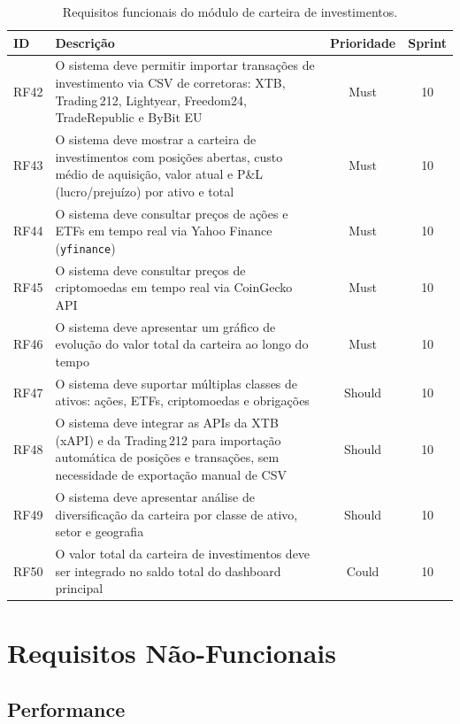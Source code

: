\begin{table}[H]
\centering
\caption{Requisitos funcionais do módulo de carteira de investimentos.}
\label{tab:rf-investimentos}
\small
\begin{tabularx}{\textwidth}{l X c c}
\toprule
\textbf{ID} & \textbf{Descrição} & \textbf{Prioridade} & \textbf{Sprint} \\
\midrule
RF42 & O sistema deve permitir importar transações de investimento via CSV de corretoras: XTB, Trading\,212, Lightyear, Freedom24, TradeRepublic e ByBit EU & Must & 10 \\
RF43 & O sistema deve mostrar a carteira de investimentos com posições abertas, custo médio de aquisição, valor atual e P\&L (lucro/prejuízo) por ativo e total & Must & 10 \\
RF44 & O sistema deve consultar preços de ações e ETFs em tempo real via Yahoo Finance (\texttt{yfinance}) & Must & 10 \\
RF45 & O sistema deve consultar preços de criptomoedas em tempo real via CoinGecko \ac{API} & Must & 10 \\
RF46 & O sistema deve apresentar um gráfico de evolução do valor total da carteira ao longo do tempo & Must & 10 \\
RF47 & O sistema deve suportar múltiplas classes de ativos: ações, ETFs, criptomoedas e obrigações & Should & 10 \\
RF48 & O sistema deve integrar as APIs da XTB (xAPI) e da Trading\,212 para importação automática de posições e transações, sem necessidade de exportação manual de CSV & Should & 10 \\
RF49 & O sistema deve apresentar análise de diversificação da carteira por classe de ativo, setor e geografia & Should & 10 \\
RF50 & O valor total da carteira de investimentos deve ser integrado no saldo total do dashboard principal & Could & 10 \\
\bottomrule
\end{tabularx}
\end{table}


\section{Requisitos Não-Funcionais}
\label{sec:req-nao-funcionais}

\subsection{Performance}

